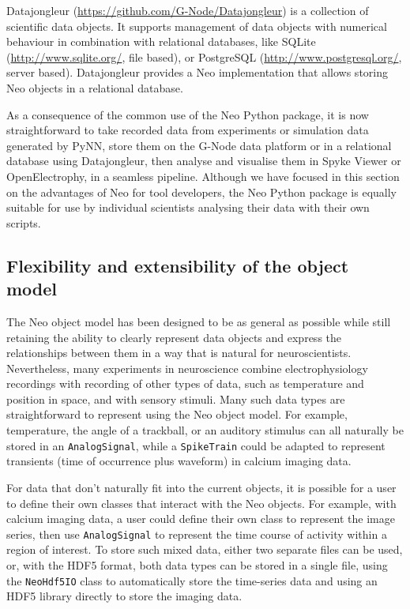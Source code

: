 \documentclass{frontiers}
\begin{document}
Datajongleur (\url{https://github.com/G-Node/Datajongleur}) is a collection of
scientific data objects. It supports management of data objects with numerical
behaviour in combination with relational databases, like SQLite
(\url{http://www.sqlite.org/}, file based), or PostgreSQL
(\url{http://www.postgresql.org/}, server based). Datajongleur provides
a Neo implementation that allows storing Neo objects in a relational database.


As a consequence of the common use of the Neo Python package, it is now straightforward to take recorded data from experiments or simulation data generated by PyNN, store them on the G-Node data platform or in a relational database using Datajongleur, then analyse and visualise them in Spyke Viewer or OpenElectrophy, in a seamless pipeline.
Although we have focused in this section on the advantages of Neo for tool developers, the Neo Python package is equally suitable for use by individual scientists analysing their data with their own scripts.


\subsection{Flexibility and extensibility of the object model}

The Neo object model has been designed to be as general as possible while still retaining the ability to clearly represent data objects and express the relationships between them in a way that is natural for neuroscientists. Nevertheless, many experiments in neuroscience combine electrophysiology recordings with recording of other types of data, such as temperature and position in space, and with sensory stimuli. Many such data types are straightforward to represent using the Neo object model. For example, temperature, the angle of a trackball, or an auditory stimulus can all naturally be stored in an  \lstinline`AnalogSignal`, while a \lstinline`SpikeTrain` could be adapted to represent transients (time of occurrence plus waveform) in calcium imaging data.

For data that don't naturally fit into the current objects, it is possible for a user to define their own classes that interact with the Neo objects. For example, with calcium imaging data, a user could define their own class to represent the image series, then use  \lstinline`AnalogSignal` to represent the time course of activity within a region of interest. To store such mixed data, either two separate files can be used, or, with the HDF5 format, both data types can be stored in a single file, using the \lstinline`NeoHdf5IO` class to automatically store the time-series data and using an HDF5 library directly to store the imaging data.
\end{document}
